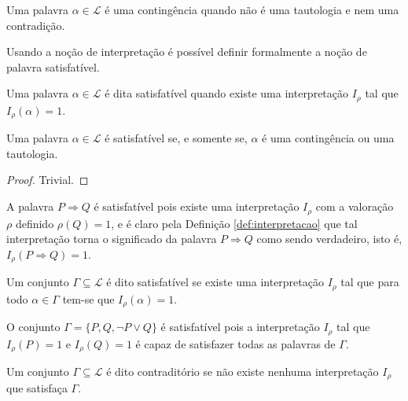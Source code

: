 \begin{definicao}[Contingência]
  Uma palavra $\alpha \in \mathcal{L}$ é uma contingência quando não é uma tautologia e nem uma contradição.
\end{definicao}

Usando a noção de interpretação é possível definir formalmente a noção de palavra satisfatível.

\begin{definicao}
  Uma palavra $\alpha \in \mathcal{L}$ é dita satisfatível quando existe uma interpretação $I_\rho$ tal que $I_\rho(\alpha) = 1$.
\end{definicao}

\begin{proposicao}
  Uma palavra $\alpha \in \mathcal{L}$ é satisfatível se, e somente se, $\alpha$ é uma contingência ou uma tautologia.
\end{proposicao}

\begin{proof}
  Trivial.
\end{proof}

\begin{exemplo}
  A palavra $P \Rightarrow Q$ é satisfatível pois existe uma interpretação $I_\rho$ com a valoração $\rho$ definido $\rho(Q) = 1$, e é claro pela Definição \ref{def:interpretacao} que tal interpretação torna o significado da palavra $P \Rightarrow Q$ como sendo verdadeiro, isto é, $I_\rho(P \Rightarrow Q) = 1$.
\end{exemplo}

\begin{definicao}
  Um conjunto $\Gamma \subseteq \mathcal{L}$ é dito satisfatível se existe uma interpretação $I_\rho$ tal que para todo $\alpha \in \Gamma$ tem-se que $I_\rho(\alpha) = 1$.
\end{definicao}

\begin{exemplo}
  O conjunto $\Gamma = \{P, Q, \neg P \lor Q\}$ é satisfatível pois a interpretação $I_\rho$ tal que $I_\rho(P) = 1$ e $I_\rho(Q) = 1$ é capaz de satisfazer todas as palavras de $\Gamma$.
\end{exemplo}

\begin{definicao}
  Um conjunto $\Gamma \subseteq \mathcal{L}$ é dito contraditório se não existe nenhuma interpretação $I_\rho$ que satisfaça $\Gamma$.
\end{definicao}

